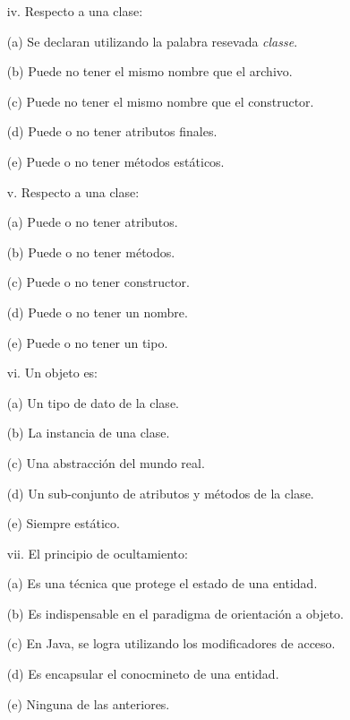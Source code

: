 \documentclass[10pt]{article}
\begin{document}
\begin{enumerate}
{\begin{multicols}{2}
    \begin{enumerate}[label=(\alph*)]
        \item[iv.] Respecto a una clase:
        \item[(a)] Se declaran utilizando la palabra resevada \emph{classe}.
        \item[(b)] Puede no tener el mismo nombre que el archivo.
        \item[(c)] Puede no tener el mismo nombre que el constructor.
        \item[(d)] Puede o no tener atributos finales.
        \item[(e)] Puede o no tener m\'etodos est\'aticos.
    \end{enumerate}

    \begin{enumerate}[label=(\alph*)]
        \item[v.] Respecto a una clase:
        \item[(a)] Puede o no tener atributos.
        \item[(b)] Puede o no tener m\'etodos.
        \item[(c)] Puede o no tener constructor.
        \item[(d)] Puede o no tener un nombre.
        \item[(e)] Puede o no tener un tipo.
    \end{enumerate}
    
    \begin{enumerate}[label=(\alph*)]
        \item[vi.] Un objeto es: 
        \item[(a)] Un tipo de dato de la clase.
        \item[(b)] La instancia de una clase.
        \item[(c)] Una abstracci\'on del mundo real.        
        \item[(d)] Un sub-conjunto de atributos y m\'etodos de la clase.
        \item[(e)] Siempre est\'atico.
    \end{enumerate}

    \begin{enumerate}[label=(\alph*)]
        \item[vii.] El principio de ocultamiento: 
        \item[(a)] Es una t\'ecnica que protege el estado de una entidad.
        \item[(b)] Es indispensable en el paradigma de orientaci\'on a objeto.
        \item[(c)] En Java, se logra utilizando los modificadores de acceso.
        \item[(d)] Es encapsular el conocmineto de una entidad.
        \item[(e)] Ninguna de las anteriores.
    \end{enumerate}


\end{multicols}}
\end{enumerate}
\end{document}

